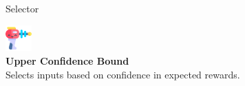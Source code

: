\documentclass{beamer}
\begin{document}
\begin{frame}{Selector}
    \begin{minipage}{0.3\textwidth}
        \centering
        \begin{tcolorbox}[
            colframe=yellow!70, 
            colback=yellow!10, 
            rounded corners, 
            width=\textwidth, 
            sharp corners=north,
            boxsep=1pt, 
            text width=2.8cm, 
            height=4.5cm,
        ]
            \includegraphics[width=1cm]{stickers/weapon1.png} \\ %
            \textbf{Upper Confidence Bound} \\
            Selects inputs based on confidence in expected rewards.
        \end{tcolorbox}
    \end{minipage}


\end{frame}
\end{document}
